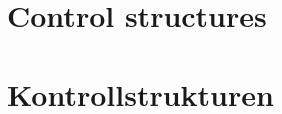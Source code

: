 \maketitle
\clearpage
\tableofcontents
\clearpage

\ifen
\section{Control structures}
\fi
\ifde
\section{Kontrollstrukturen}
\fi






